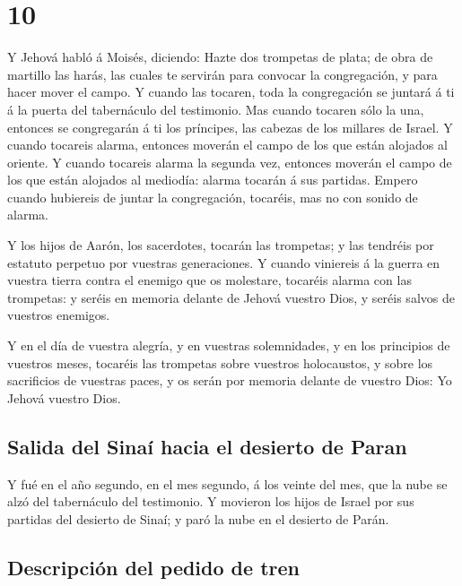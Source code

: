 \hypertarget{section-9}{%
\section{10}\label{section-9}}

 Y Jehová habló á Moisés, diciendo:  Hazte
dos trompetas de plata; de obra de martillo las harás, las cuales te
servirán para convocar la congregación, y para hacer mover el campo.
 Y cuando las tocaren, toda la congregación se juntará á
ti á la puerta del tabernáculo del testimonio.  Mas cuando
tocaren sólo la una, entonces se congregarán á ti los príncipes, las
cabezas de los millares de Israel.  Y cuando tocareis
alarma, entonces moverán el campo de los que están alojados al oriente.
 Y cuando tocareis alarma la segunda vez, entonces moverán
el campo de los que están alojados al mediodía: alarma tocarán á sus
partidas.  Empero cuando hubiereis de juntar la
congregación, tocaréis, mas no con sonido de alarma.

 Y los hijos de Aarón, los sacerdotes, tocarán las
trompetas; y las tendréis por estatuto perpetuo por vuestras
generaciones.  Y cuando viniereis á la guerra en vuestra
tierra contra el enemigo que os molestare, tocaréis alarma con las
trompetas: y seréis en memoria delante de Jehová vuestro Dios, y seréis
salvos de vuestros enemigos.

 Y en el día de vuestra alegría, y en vuestras
solemnidades, y en los principios de vuestros meses, tocaréis las
trompetas sobre vuestros holocaustos, y sobre los sacrificios de
vuestras paces, y os serán por memoria delante de vuestro Dios: Yo
Jehová vuestro Dios.

\hypertarget{salida-del-sinauxed-hacia-el-desierto-de-paran}{%
\subsection{Salida del Sinaí hacia el desierto de
Paran}\label{salida-del-sinauxed-hacia-el-desierto-de-paran}}

 Y fué en el año segundo, en el mes segundo, á los veinte
del mes, que la nube se alzó del tabernáculo del testimonio.
 Y movieron los hijos de Israel por sus partidas del
desierto de Sinaí; y paró la nube en el desierto de Parán.

\hypertarget{descripciuxf3n-del-pedido-de-tren}{%
\subsection{Descripción del pedido de
tren}\label{descripciuxf3n-del-pedido-de-tren}}

